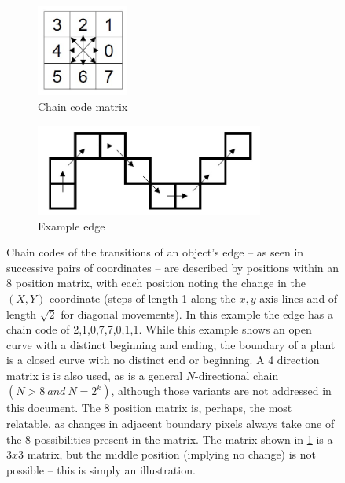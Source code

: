 \documentclass[letterpaper]{article}
\begin{document}
{{ \begin{figure}[h!]
	\centering
	\begin{subfigure}[h]{.4\textwidth}
	  \centering
	  \includegraphics[height=3cm]{./figures/chain-code-matrix.jpg}
	  \caption{Chain code matrix}
	  \label{fig:chain-code-matrix}
	\end{subfigure}
	\begin{subfigure}[h]{.4\textwidth}
	  \centering
	  \includegraphics[height=3cm]{./figures/chain-code-cells.jpg}
	  \caption{Example edge}
	  \label{fig:chain-example}
	\end{subfigure}
	\caption[Boundary chain codes]{Chain codes of the transitions of an object's edge -- as seen in successive pairs of coordinates -- are described by positions within an 8 position matrix, with each position noting the change in the $(X, Y)$ coordinate (steps of length 1 along the $x,y$ axis lines and of length $\sqrt{2}$ for diagonal movements). In this example the edge has a chain code of 2,1,0,7,7,0,1,1. While this example shows an open curve with a distinct beginning and ending, the boundary of a plant is a closed curve with no distinct end or beginning. A 4 direction matrix is is also used, as is a general $N$-directional chain $(N > 8\ and\ N =2^k)$, although those variants are not addressed in this document. The 8 position matrix is, perhaps, the most relatable, as changes in adjacent boundary pixels always take one of the 8 possibilities present in the matrix. The matrix shown in \ref{fig:chain-code-matrix} is a $3x3$ matrix, but the middle position (implying no change) is not possible -- this is simply an illustration.}
	\label{fig:chain-codes}
\end{figure}

}}
\end{document}
